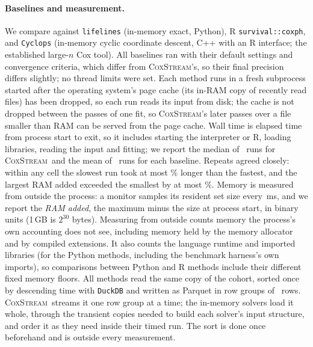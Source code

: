 \documentclass[11pt,a4paper]{article}
\newcommand{\coxstream}{\textsc{CoxStream}}
\begin{document}
\paragraph{Baselines and measurement.} We compare against \texttt{lifelines}
(in-memory exact, Python), R \texttt{survival::coxph},
and \texttt{Cyclops} \citep{mittal2014highdim} (in-memory cyclic coordinate
descent, C++ with an R interface; the established large-$n$ Cox tool). All
baselines ran with their default settings and convergence criteria, which
differ from \coxstream's, so their final precision differs slightly; no thread
limits were set. Each method
runs in a fresh subprocess started after the operating system's page cache
(its in-RAM copy of recently read files) has been dropped, so each run reads
its input from disk; the cache is not dropped between the passes of one fit,
so \coxstream's later passes over a file smaller than RAM can be served from
the page cache. Wall time is elapsed time from process start to exit, so it
includes starting the interpreter or R, loading libraries, reading the input
and fitting; we report the median of \CoxStreamReps\ runs for \coxstream\ and
the mean of \BaselineReps\ runs for each baseline. Repeats agreed closely:
within any cell the slowest run took at most \WallSpreadPct\% longer than the
fastest, and the largest RAM added exceeded the smallest by at most
\RAMSpreadPct\%. Memory is measured from
outside the process: a monitor samples its resident set size every \RSSPollMs\,ms, and
we report the \emph{RAM added}, the maximum minus the size at process start,
in binary units (1\,GB is $2^{30}$ bytes).
Measuring from outside counts memory the process's own accounting does not
see, including memory held by the memory allocator and by compiled extensions. It
also counts the language runtime and imported libraries (for the Python
methods, including the benchmark harness's own imports), so comparisons
between Python and R methods include their different fixed memory floors. All
methods read the same copy of the cohort, sorted once by descending time with
\texttt{DuckDB} and written as Parquet in row groups of \CoxStreamChunkRows\
rows. \coxstream\ streams it one row group at a time; the in-memory solvers
load it whole, through the transient copies needed to build each solver's
input structure, and order it as they need inside their timed run. The sort is
done once beforehand and is outside every measurement.
\end{document}
